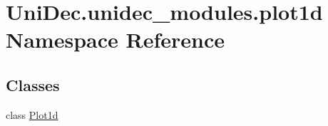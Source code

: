 \hypertarget{namespace_uni_dec_1_1unidec__modules_1_1plot1d}{}\section{Uni\+Dec.\+unidec\+\_\+modules.\+plot1d Namespace Reference}
\label{namespace_uni_dec_1_1unidec__modules_1_1plot1d}
\subsection*{Classes}
\begin{DoxyCompactItemize}
\item 
class \hyperlink{class_uni_dec_1_1unidec__modules_1_1plot1d_1_1_plot1d}{Plot1d}
\end{DoxyCompactItemize}
